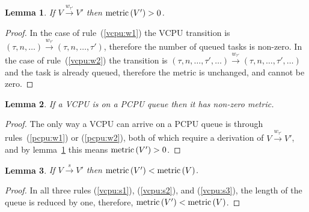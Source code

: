 \documentclass{article}
\newcommand\paren[1]{\left( {#1} \right)}
\newcommand\sched{\xrightarrow{s}}
\newcommand\wake[1]{\xrightarrow{w_{#1}}}
\newcommand\vcpu[1]{\paren{#1}}
\newtheorem{lma}{Lemma}
\begin{document}
\begin{lma}\label{lma:nonzerometricV}
  If $V\wake{\tau'}V'$ then $\metric {V'}>0$.
\end{lma}
\begin{proof}
  In the case of rule~(\ref{vcpu:w1}) the VCPU transition is
  $\vcpu{\tau,n,\ldots}\wake{\tau'}\vcpu{\tau,n,\ldots,\tau'}$,
  therefore the number of queued tasks is non-zero.  In the case of
  rule~(\ref{vcpu:w2}) the transition is
  $\vcpu{\tau,n,\ldots,\tau',\ldots}\wake{\tau'}\vcpu{\tau,n,\ldots,\tau',\ldots}$
  and the task is already queued, therefore the metric is unchanged,
  and cannot be zero.
\end{proof}

\begin{lma}\label{lma:nonzerometric}
  If a VCPU is on a PCPU queue then it has non-zero metric.
\end{lma}
\begin{proof}
  The only way a VCPU can arrive on a PCPU queue is through
  rules~(\ref{pcpu:w1}) or (\ref{pcpu:w2}), both of which require a
  derivation of $V\wake{\tau'}V'$, and by
  lemma~\ref{lma:nonzerometricV} this means $\metric{V'}>0$.
\end{proof}

\begin{lma}
  \label{lma:indstepV}
  If $V\sched V'$ then $\metric{V'}<\metric{V}$.
\end{lma}
\begin{proof}
  In all three rules (\ref{vcpu:s1}), (\ref{vcpu:s2}), and
  (\ref{vcpu:s3}), the length of the queue is reduced by one,
  therefore, $\metric{V'}<\metric{V}$.
\end{proof}
\end{document}

